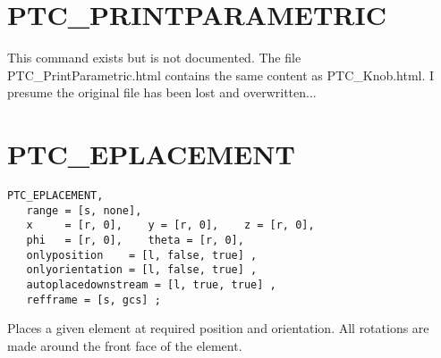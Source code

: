  
% 
% 


% 

\section{PTC\_PRINTPARAMETRIC}

This command exists but is not documented. The file
PTC\_PrintParametric.html contains the same content as PTC\_Knob.html. I
presume the original file has been lost and overwritten...


%

\section{PTC\_EPLACEMENT}

\begin{verbatim}
PTC_EPLACEMENT, 
   range = [s, none],
   x     = [r, 0],    y = [r, 0],    z = [r, 0],
   phi   = [r, 0],    theta = [r, 0], 
   onlyposition    = [l, false, true] ,
   onlyorientation = [l, false, true] ,
   autoplacedownstream = [l, true, true] ,
   refframe = [s, gcs] ; 
\end{verbatim}


Places a given element at required position and orientation.  All
rotations are made around the front face of the element.

